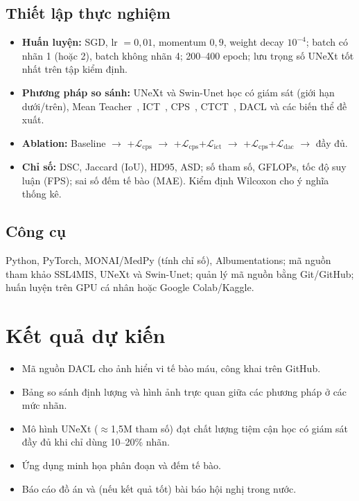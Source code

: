 \documentclass[12pt,a4paper]{article}
\newcommand{\Lcps}{\mathcal{L}_{\mathrm{cps}}}
\newcommand{\Lict}{\mathcal{L}_{\mathrm{ict}}}
\newcommand{\Ldac}{\mathcal{L}_{\mathrm{dac}}}
\begin{document}
\subsection{Thiết lập thực nghiệm}
\begin{itemize}
  \item \textbf{Huấn luyện:} SGD, lr $=0{,}01$, momentum $0{,}9$, weight decay $10^{-4}$;
        batch có nhãn 1 (hoặc 2), batch không nhãn 4; 200--400 epoch; lưu trọng số UNeXt
        tốt nhất trên tập kiểm định.
  \item \textbf{Phương pháp so sánh:} UNeXt và Swin-Unet học có giám sát (giới hạn
        dưới/trên), Mean Teacher~\cite{tarvainen2017mt}, ICT~\cite{verma2022ict},
        CPS~\cite{chen2021cps}, CTCT~\cite{luo2022ctct}, DACL và các biến thể đề xuất.
  \item \textbf{Ablation:} Baseline $\rightarrow$ +$\Lcps$ $\rightarrow$
        +$\Lcps$+$\Lict$ $\rightarrow$ +$\Lcps$+$\Ldac$ $\rightarrow$ đầy đủ.
  \item \textbf{Chỉ số:} DSC, Jaccard (IoU), HD95, ASD; số tham số, GFLOPs, tốc độ
        suy luận (FPS); sai số đếm tế bào (MAE). Kiểm định Wilcoxon cho ý nghĩa thống kê.
\end{itemize}

\subsection{Công cụ}
Python, PyTorch, MONAI/MedPy (tính chỉ số), Albumentations; mã nguồn tham khảo SSL4MIS,
UNeXt và Swin-Unet; quản lý mã nguồn bằng Git/GitHub; huấn luyện trên GPU cá nhân hoặc
Google Colab/Kaggle.

\section{Kết quả dự kiến}
\begin{itemize}
  \item Mã nguồn DACL cho ảnh hiển vi tế bào máu, công khai trên GitHub.
  \item Bảng so sánh định lượng và hình ảnh trực quan giữa các phương pháp ở các mức nhãn.
  \item Mô hình UNeXt ($\approx$1{,}5M tham số) đạt chất lượng tiệm cận học có giám sát
        đầy đủ khi chỉ dùng 10--20\% nhãn.
  \item Ứng dụng minh họa phân đoạn và đếm tế bào.
  \item Báo cáo đồ án và (nếu kết quả tốt) bài báo hội nghị trong nước.
\end{itemize}
\end{document}
